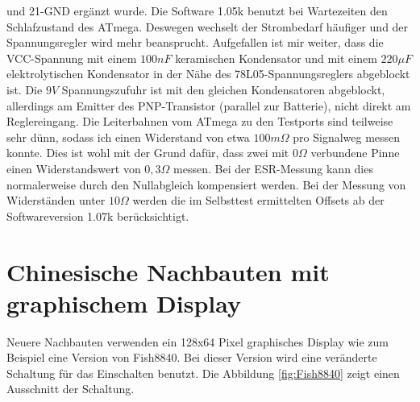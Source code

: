und 21-GND ergänzt wurde. Die Software 1.05k benutzt bei Wartezeiten den Schlafzustand des ATmega.
Deswegen wechselt der Strombedarf häufiger und der Spannungsregler wird mehr beansprucht.
Aufgefallen ist mir weiter, dass die VCC-Spannung mit einem \(100nF\) keramischen Kondensator und mit
einem \(220\mu F\) elektrolytischen Kondensator in der Nähe des 78L05-Spannungsreglers abgeblockt ist.
Die \(9V\) Spannungszufuhr ist mit den gleichen Kondensatoren abgeblockt, allerdings am Emitter des PNP-Transistor
(parallel zur Batterie), nicht direkt am Reglereingang.
Die Leiterbahnen vom ATmega zu den Testports sind teilweise sehr dünn, sodass ich einen Widerstand
von etwa \(100m\Omega\) pro Signalweg messen konnte. Dies ist wohl mit der Grund dafür, dass zwei
mit \(0\Omega\) verbundene Pinne einen Widerstandswert von \(0,3\Omega\) messen.
Bei der ESR-Messung kann dies normalerweise durch den Nullabgleich kompensiert werden.
Bei der Messung von Widerständen unter \(10\Omega\) werden die im Selbsttest ermittelten Offsets 
ab der Softwareversion 1.07k berücksichtigt.

\section{Chinesische Nachbauten mit graphischem Display}
Neuere Nachbauten verwenden ein 128x64 Pixel graphisches Display wie zum Beispiel eine Version von Fish8840.
Bei dieser Version wird eine veränderte Schaltung für das Einschalten benutzt. Die Abbildung \ref{fig:Fish8840}
zeigt einen Ausschnitt der Schaltung.

